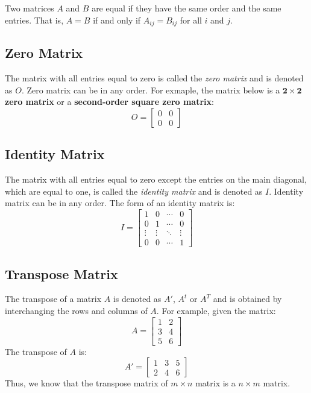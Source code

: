 \documentclass{report}
\begin{document}
\begin{multicols}{2}
  \doublespacing{}

  Two matrices $A$ and $B$ are equal if they have the same order and the same
  entries. That is, $A = B$ if and only if $A_{ij} = B_{ij}$ for all $i$ and $j$.

  \singlespacing{}

  \subsection*{Zero Matrix}

  \doublespacing{}

  The matrix with all entries equal to zero is called the \emph{zero matrix} and
  is denoted as $O$. Zero matrix can be in any order. For exmaple, the matrix
  below is a \textbf{$\mathbf{2 \times 2}$ zero matrix} or a \textbf{second-order
    square zero matrix}:
  \[
    O = \begin{bmatrix}
      0 & 0 \\
      0 & 0
    \end{bmatrix}
  \]

  \singlespacing{}

  \subsection*{Identity Matrix}

  \doublespacing{}

  The matrix with all entries equal to zero except the entries on the main
  diagonal, which are equal to one, is called the \emph{identity matrix} and is
  denoted as $I$. Identity matrix can be in any order. The form of an identity
  matrix is:
  \[
    I = \begin{bmatrix}
      1      & 0      & \cdots & 0      \\
      0      & 1      & \cdots & 0      \\
      \vdots & \vdots & \ddots & \vdots \\
      0      & 0      & \cdots & 1
    \end{bmatrix}
  \]

  \singlespacing{}

  \subsection*{Transpose Matrix}

  \doublespacing{}

  The transpose of a matrix $A$ is denoted as $A'$, $A^t$ or $A^T$ and is
  obtained by interchanging the rows and columns of $A$. For example, given the
  matrix:
  \[
    A = \begin{bmatrix}
      1 & 2 \\
      3 & 4 \\
      5 & 6
    \end{bmatrix}
  \]
  The transpose of $A$ is:
  \[
    A' = \begin{bmatrix}
      1 & 3 & 5 \\
      2 & 4 & 6
    \end{bmatrix}
  \]
  Thus, we know that the transpose matrix of $m \times n$ matrix is a $n \times
    m$ matrix.


\end{multicols}
\end{document}

